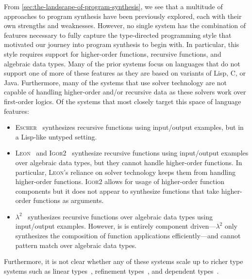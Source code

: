 From \autoref{sec:the-landscape-of-program-synthesis}, we see that a multitude of approaches to program synthesis have been previously explored, each with their own strengths and weaknesses.
However, no single system has the combination of features necessary to fully capture the type-directed programming style that motivated our journey into program synthesis to begin with.
In particular, this style requires support for higher-order functions, recursive functions, and algebraic data types.
Many of the prior systems focus on languages that do not support one of more of these features as they are based on variants of Lisp, C, or Java.
Furthermore, many of the systems that use solver technology are not capable of handling higher-order and/or recursive data as these solvers work over first-order logics.
Of the systems that most closely target this space of language features:
\begin{itemize}
  \item \textsc{Escher}~\citep{albarghouthi-cav-2013} synthesizes recursive functions using input/output examples, but in a Lisp-like untyped setting.
  \item \textsc{Leon}~\citep{kuncak-pldi-2010} and \textsc{Igor2}~\citep{hofmann-aaip-2010} synthesize recursive functions using input/output examples over algebraic data types, but they cannot handle higher-order functions.
    In particular, \textsc{Leon}'s reliance on solver technology keeps them from handling higher-order functions.
    \textsc{Igor2} allows for usage of higher-order function components but it does not appear to synthesize functions that take higher-order functions as arguments.
  \item $λ^2$~\citep{feser-pldi-2015} synthesizes recursive functions over algebraic data types using input/output examples.
    However, is is entirely component driven---$λ^2$ only synthesizes the composition of function applications efficiently---and cannot pattern match over algebraic data types.
\end{itemize}
Furthermore, it is not clear whether any of these systems scale up to richer type systems such as linear types~\citep{girard-1987}, refinement types~\citep{freeman-pldi-1991}, and dependent types~\citep{martin-lof-1984}.

